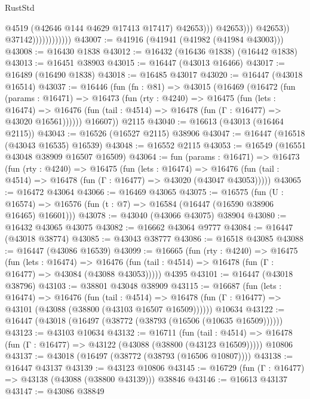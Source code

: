 \begin{lexlean}{RustStd}
\begin{coremodule}
                                            @4519
                                            (@42646 @144 @4629 @17413 @17417)
                                            @42653)))
                                      @42653)))
                                @42653))
                            @37142))))))))))))
@43007 := @41916 (@41941 (@41982 (@41984 @43003)))
@43008 := @16430 @1838
@43012 := @16432 (@16436 @1838) (@16442 @1838)
@43013 := @16451 @38903
@43015 := @16447 (@43013 @16466)
@43017 := @16489 (@16490 @1838)
@43018 := @16485 @43017
@43020 := @16447 (@43018 @16514)
@43037 := @16446
    (fun (fn : @81) =>
    @43015
      (@16469
        (@16472
          (fun (params : @16471) =>
          @16473
            (fun (rty : @4240) =>
            @16475
              (fun (lets : @16474) =>
              @16476 (fun (tail : @4514) => @16478 (fun (Γ : @16477) => @43020 @16561))))))
        @16607))
    @2115
@43040 := @16613 (@43013 (@16464 @2115))
@43043 := @16526 (@16527 @2115) @38906
@43047 := @16447 (@16518 (@43043 @16535) @16539)
@43048 := @16552 @2115
@43053 := @16549 (@16551 @43048 @38909 @16507 @16509)
@43064 := fun (params : @16471) =>
  @16473
    (fun (rty : @4240) =>
    @16475
      (fun (lets : @16474) =>
      @16476 (fun (tail : @4514) => @16478 (fun (Γ : @16477) => @43020 (@43047 @43053)))))
@43065 := @16472 @43064
@43066 := @16469 @43065
@43075 := @16575
    (fun (U : @16574) => @16576 (fun (t : @7) => @16584 (@16447 (@16590 @38906 @16465) @16601)))
@43078 := @43040 (@43066 @43075) @38904
@43080 := @16432 @43065 @43075
@43082 := @16662 @43064 @9777
@43084 := @16447 (@43018 @38774)
@43085 := @43043 @38777
@43086 := @16518 @43085
@43088 := @16447 (@43086 @16539)
@43099 := @16665
    (fun (rty : @4240) =>
    @16475
      (fun (lets : @16474) =>
      @16476 (fun (tail : @4514) => @16478 (fun (Γ : @16477) => @43084 (@43088 @43053)))))
    @4395
@43101 := @16447 (@43018 @38796)
@43103 := @38801 @43048 @38909
@43115 := @16687
    (fun (lets : @16474) =>
    @16476
      (fun (tail : @4514) =>
      @16478 (fun (Γ : @16477) => @43101 (@43088 (@38800 (@43103 @16507 @16509))))))
    @10634
@43122 := @16447 (@43018 (@16497 (@38772 (@38793 (@16506 (@10635 @16509))))))
@43123 := @43103 @10634
@43132 := @16711
    (fun (tail : @4514) => @16478 (fun (Γ : @16477) => @43122 (@43088 (@38800 (@43123 @16509)))))
    @10806
@43137 := @43018 (@16497 (@38772 (@38793 (@16506 @10807))))
@43138 := @16447 @43137
@43139 := @43123 @10806
@43145 := @16729 (fun (Γ : @16477) => @43138 (@43088 (@38800 @43139))) @38846
@43146 := @16613 @43137
@43147 := @43086 @38849

\end{coremodule}
\end{lexlean}
